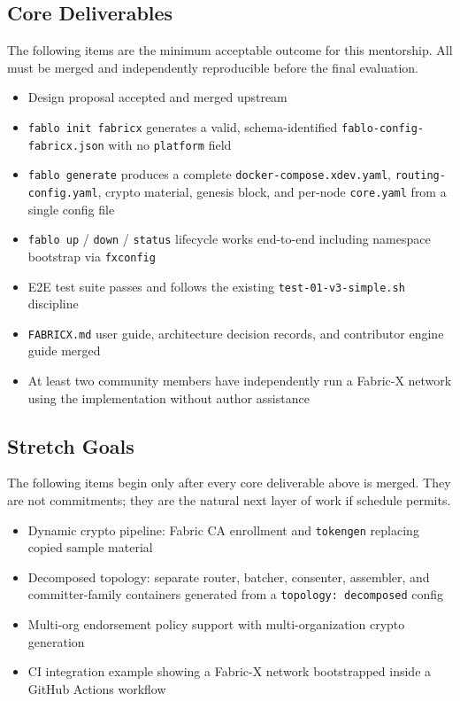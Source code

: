 \subsection*{Core Deliverables}

The following items are the minimum acceptable outcome
for this mentorship. All must be merged and independently
reproducible before the final evaluation.

\begin{itemize}[leftmargin=2em]
  \item[\checkmark] Design proposal accepted and merged upstream
  \item[\checkmark] \texttt{fablo init fabricx} generates a
        valid, schema-identified \texttt{fablo-config-fabricx.json}
        with no \texttt{platform} field
  \item[\checkmark] \texttt{fablo generate} produces a complete
        \texttt{docker-compose.xdev.yaml}, \texttt{routing-config.yaml},
        crypto material, genesis block, and per-node
        \texttt{core.yaml} from a single config file
  \item[\checkmark] \texttt{fablo up} / \texttt{down} /
        \texttt{status} lifecycle works end-to-end including
        namespace bootstrap via \texttt{fxconfig}
  \item[\checkmark] E2E test suite passes and follows the
        existing \texttt{test-01-v3-simple.sh} discipline
  \item[\checkmark] \texttt{FABRICX.md} user guide, architecture
        decision records, and contributor engine guide merged
  \item[\checkmark] At least two community members have
        independently run a Fabric-X network using the
        implementation without author assistance
\end{itemize}

\subsection*{Stretch Goals}

The following items begin only after every core deliverable
above is merged. They are not commitments; they are the
natural next layer of work if schedule permits.

\begin{itemize}[leftmargin=2em]
  \item Dynamic crypto pipeline: Fabric CA enrollment and
        \texttt{tokengen} replacing copied sample material
  \item Decomposed topology: separate router, batcher,
        consenter, assembler, and committer-family containers
        generated from a \texttt{topology: decomposed} config
  \item Multi-org endorsement policy support with
        multi-organization crypto generation
  \item CI integration example showing a Fabric-X network
        bootstrapped inside a GitHub Actions workflow
\end{itemize}
